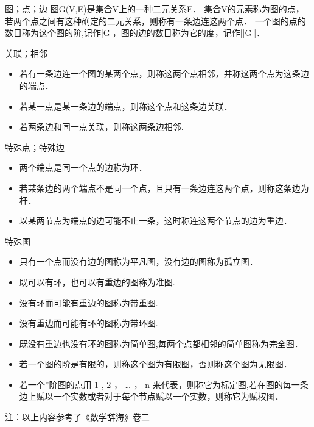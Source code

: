 
\begin{issues}
\end{issues}



\begin{definition}{图；点；边}
图G(V,E)是集合V上的一种二元关系E．
集合V的元素称为图的点，若两个点之间有这种确定的二元关系，则称有一条边连这两个点．
一个图的点的数目称为这个图的阶,记作|G|，图的边的数目称为它的度，记作||G||．
\end{definition}

\begin{definition}{关联；相邻}
\begin{itemize}
\item 若有一条边连一个图的某两个点，则称这两个点相邻，并称这两个点为这条边的端点．
\item 若某一点是某一条边的端点，则称这个点和这条边关联．
\item 若两条边和同一点关联，则称这两条边相邻.
\end{itemize}
\end{definition}
\begin{definition}{特殊点；特殊边}
\begin{itemize}
\item 两个端点是同一个点的边称为环．
\item 若某条边的两个端点不是同一个点，且只有一条边连这两个点，则称这条边为杆．
\item 以某两节点为端点的边可能不止一条，这时称连这两个节点的边为重边．
\end{itemize}
\end{definition}
\begin{definition}{特殊图}
\begin{itemize}
\item 只有一个点而没有边的图称为平凡图，没有边的图称为孤立图．
\item 既可以有环，也可以有重边的图称为准图.
\item 没有环而可能有重边的图称为带重图.
\item 没有重边而可能有环的图称为带环图.
\item 既没有重边也没有环的图称为简单图,每两个点都相邻的简单图称为完全图．
\item 若一个图的阶是有限的，则称这个图为有限图，否则称这个图为无限图．
\item 若一个”阶图的点用 1 , 2 ， … ， n 来代表，则称它为标定图,若在图的每一条边上赋以一个实数或者对于每个节点赋以一个实数，则称它为赋权图．
\end{itemize}
\end{definition}

注：以上内容参考了《数学辞海》卷二
